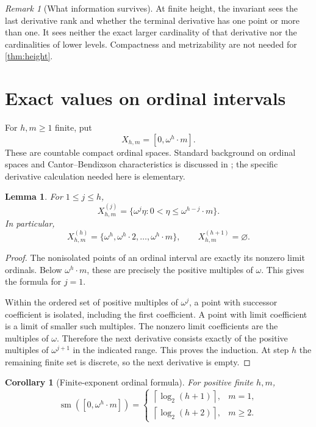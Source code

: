 \documentclass[11pt,letterpaper]{article}
\numberwithin{equation}{section}
\newtheorem{lemma}[lemma]{Lemma}
\newtheorem{corollary}[corollary]{Corollary}
\theoremstyle{definition}
\theoremstyle{remark}
\newtheorem{remark}[remark]{Remark}
\theoremstyle{definition}
\newcommand{\sm}{\operatorname{sm}}
\newcommand{\ceil}[1]{\left\lceil#1\right\rceil}
\begin{document}
\begin{remark}[What information survives]
At finite height, the invariant sees the last derivative rank and whether the
terminal derivative has one point or more than one. It sees neither the exact
larger cardinality of that derivative nor the cardinalities of lower levels.
Compactness and metrizability are not needed for \cref{thm:height}.
\end{remark}

\section{Exact values on ordinal intervals}\label{sec:ordinals}

For $h,m\geq1$ finite, put
\[
 X_{h,m}=[0,\omega^h\cdot m].
\]
These are countable compact ordinal spaces. Standard background on ordinal
spaces and Cantor--Bendixson characteristics is discussed in \cite{AM}; the
specific derivative calculation needed here is elementary.

\begin{lemma}\label{lem:ordinal-rank}
For $1\leq j\leq h$,
\begin{equation}\label{eq:ordinal-derivative}
 X_{h,m}^{(j)}=
 \{\omega^j\eta:0<\eta\leq\omega^{h-j}\cdot m\}.
\end{equation}
In particular,
\[
 X_{h,m}^{(h)}=\{\omega^h,\omega^h\cdot2,\ldots,\omega^h\cdot m\},
 \qquad X_{h,m}^{(h+1)}=\varnothing.
\]
\end{lemma}
\begin{proof}
The nonisolated points of an ordinal interval are exactly its nonzero limit
ordinals. Below $\omega^h\cdot m$, these are precisely the positive multiples
of $\omega$. This gives the formula for $j=1$.

Within the ordered set of positive multiples of $\omega^j$, a point with
successor coefficient is isolated, including the first coefficient. A point
with limit coefficient is a limit of smaller such multiples. The nonzero limit
coefficients are the multiples of $\omega$. Therefore the next derivative
consists exactly of the positive multiples of $\omega^{j+1}$ in the indicated
range. This proves the induction. At step $h$ the remaining finite set is
discrete, so the next derivative is empty.
\end{proof}

\begin{corollary}[Finite-exponent ordinal formula]\label{cor:ordinal}
For positive finite $h,m$,
\begin{equation}\label{eq:ordinal-sm}
 \sm([0,\omega^h\cdot m])=
 \begin{cases}
  \ceil{\log_2(h+1)},&m=1,\\
  \ceil{\log_2(h+2)},&m\geq2.
 \end{cases}
\end{equation}
\end{corollary}
\end{document}
